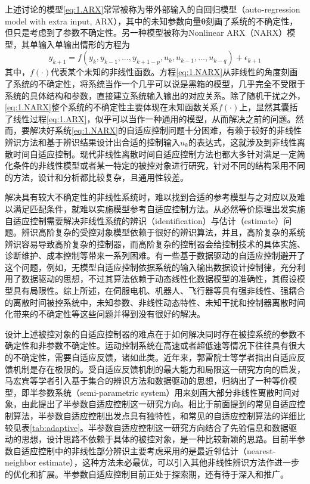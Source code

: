 上述讨论的模型\eqref{eq:1.ARX}常常被称为带外部输入的自回归模型（auto-regression model with extra input, ARX），其中的未知参数向量$\bm{\theta}$刻画了系统的不确定性，但只是考虑到了参数不确定性。另一种模型被称为Nonlinear ARX（NARX）模型，其单输入单输出情形的方程为
\begin{equation}%
\label{eq:1.NARX}
y_{k+1} = f(y_{k},y_{k-1},\ldots,y_{k+1-p},u_{k},u_{k-1},\ldots,u_{k-q})+\epsilon_{k+1}
\end{equation}
其中，$f(\cdot)$代表某个未知的非线性函数。方程\eqref{eq:1.NARX}从非线性的角度刻画了系统的不确定性，将系统当作一个几乎可以说是黑箱的模型，几乎完全不受限于系统的具体结构和参数，直接建立系统输入输出的对应关系。除了随机干扰之外，\eqref{eq:1.NARX}整个系统的不确定性主要体现在未知函数关系$f(\cdot)$上，显然其囊括了线性过程\eqref{eq:1.ARX}，似乎可以当作一种通用的模型，从而解决之前的问题。然而，要解决好系统\eqref{eq:1.NARX}的自适应控制问题十分困难，有赖于较好的非线性辨识方法和基于辨识结果设计出合适的控制输入$u_{k}$的表达式，这就涉及到非线性离散时间自适应控制。现代非线性离散时间自适应控制方法也都大多针对满足一定简化条件的非线性模型或者某一特定的被控对象进行研究，针对不同的结构采用不同的方法，设计和分析都比较复杂，且通用性较差。

解决具有较大不确定性的非线性系统时，难以找到合适的参考模型与之对应以及难以满足匹配条件，就难以实施模型参考自适应控制方法。从必然等价原理出发实施自适应控制需要解决非线性系统的辨识（identification）与估计（estimate）问题。辨识高阶复杂的受控对象模型依赖于很好的辨识算法，并且，高阶复杂的系统辨识容易导致高阶复杂的控制器，而高阶复杂的控制器会给控制技术的具体实施、诊断维护、成本控制等带来一系列困难。有一些基于数据驱动的自适应控制避开了这个问题，例如，无模型自适应控制依据系统的输入输出数据设计控制律，充分利用了数据驱动的思想，不过其算法依赖于动态线性化数据模型的准确性，其假设模型具有局限性。综上所述，在伺服电机、机器人、飞行器等具有强非线性、强耦合的离散时间被控系统中，未知参数、非线性动态特性、未知干扰和控制器离散时间化带来的不确定性等这些问题并得到没有很好的解决。

设计上述被控对象的自适应控制器的难点在于如何解决同时存在被控系统的参数不确定性和非参数不确定性。运动控制系统在高速或者超低速等情况下往往具有很大的不确定性，需要自适应反馈，诸如此类。近年来，郭雷院士等学者指出自适应反馈机制是存在极限的。受自适应反馈机制的最大能力和局限这一研究方向的启发，马宏宾等学者引入基于集合的辨识方法和数据驱动的思想，归纳出了一种等价模型，即半参数系统（semi-parametric system）用来刻画大部分非线性离散时间对象，由此提出了半参数自适应控制这一研究方向。相比于前面提到的常见自适应控制算法，半参数自适应控制出发点具有独特性，和常见的自适应控制算法的详细比较见表\eqref{tab:adaptive}。半参数自适应控制这一研究方向结合了先验信息和数据驱动的思想，设计思路不依赖于具体的被控对象，是一种比较新颖的思路。目前半参数自适应控制中的非线性部分辨识主要考虑采用的是最近邻估计（nearest-neighbor estimate），这种方法未必最优，可以引入其他非线性辨识方法作进一步的优化和扩展。半参数自适应控制目前正处于探索期，还有待于深入和推广。

